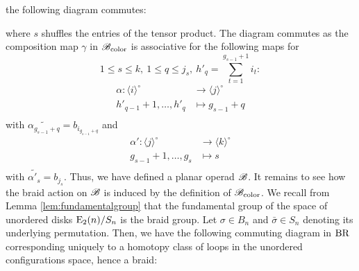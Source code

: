 \begin{eg}
    the following diagram commutes:
    \begin{center}
    \end{center}
    where $s$ shuffles the entries of the tensor product. The diagram commutes
    as the composition map $\gamma$ in $\mathscr{B}_{\text{color}}$ is associative for the following
    maps for 
    \[
    1 \leq s \leq k, \ 1 \leq q \leq j_s, \ h'_q = \sum_{t=1}^{g_{s-1}+1} i_t:
    \]
    \begin{align*}
        \alpha \colon \langle i \rangle^{\circ} &\to \langle j \rangle^{\circ} \\
        h'_{q-1}+1, \dots, h'_q &\mapsto g_{s-1}+q \\
    \end{align*}
    with $\widetilde{\alpha_{g_{s-1}+q}} = b_{i_{g_{s-1}+q}}$ and
    \begin{align*}
        \alpha' \colon \langle j \rangle^{\circ} &\to \langle k \rangle^{\circ} \\
        g_{s-1}+1, \dots, g_s &\mapsto s \\
    \end{align*}
    with $\widetilde{\alpha'_s} = b_{j_s}$. Thus, we have defined a planar
    operad $\mathscr{B}$. It remains to see how the braid action on $\mathscr{B}$ is induced by
    the definition of $\mathscr{B}_{\text{color}}$. We recall from Lemma \ref{lem:fundamentalgroup}
    that the fundamental group of the space of unordered disks $\operatorname{E}_2(n) \slash
    S_n$ is the braid group. Let $\sigma \in B_n$ and $\bar{\sigma} \in S_n$
    denoting its underlying permutation. Then, we have the following commuting
    diagram in $\operatorname{BR}$ corresponding uniquely to a homotopy class of loops in the
    unordered configurations space, hence a braid:
    \begin{center}
\end{center}
\end{eg}
